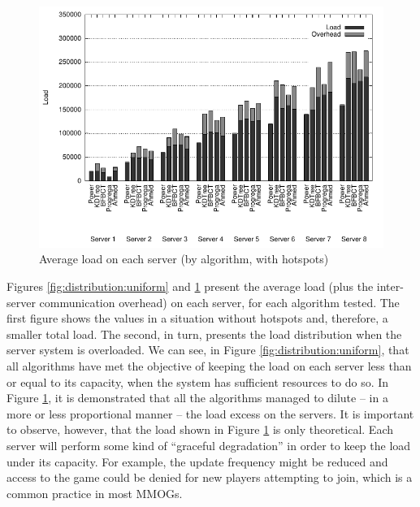 \documentclass[acmjacm]{acmtrans2m}
\begin{document}
\begin{figure}[!t]
	\centering
	\includegraphics[width=\linewidth]{images/distribution_hotspots}
	\caption{Average load on each server (by algorithm, with hotspots)}
	\label{fig:distribution:hotspots}
\end{figure}

Figures \ref{fig:distribution:uniform} and \ref{fig:distribution:hotspots} present the average load (plus the inter-server communication overhead) on each server, for each algorithm tested. The first figure shows the values in a situation without hotspots and, therefore, a smaller total load. The second, in turn, presents the load distribution when the server system is overloaded. We can see, in Figure \ref{fig:distribution:uniform}, that all algorithms have met the objective of keeping the load on each server less than or equal to its capacity, when the system has sufficient resources to do so. In Figure \ref{fig:distribution:hotspots}, it is demonstrated that all the algorithms managed to dilute -- in a more or less proportional manner -- the load excess on the servers. It is important to observe, however, that the load shown in Figure \ref{fig:distribution:hotspots} is only theoretical. Each server will perform some kind of ``graceful degradation'' in order to keep the load under its capacity. For example, the update frequency might be reduced and access to the game could be denied for new players attempting to join, which is a common practice in most MMOGs.
\end{document}
